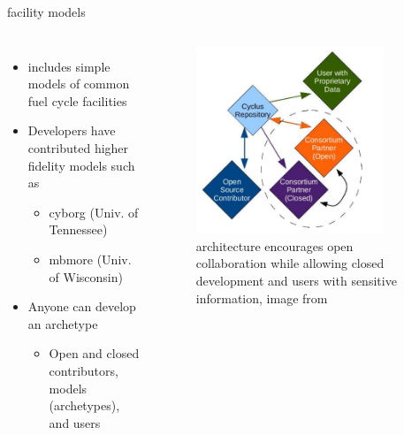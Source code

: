 \begin{frame}{\Cyclus facility models}
\begin{columns}
\begin{itemize}
    \item \Cycamore includes simple models of common fuel cycle facilities
    \item Developers have contributed higher fidelity models such as 
    \begin{itemize}
        \item cyborg (Univ. of Tennessee)
        \item mbmore (Univ. of Wisconsin)
    \end{itemize}
    \item Anyone can develop an archetype
    \begin{itemize}
        \item Open and closed contributors, models (archetypes), and users
    \end{itemize}
\end{itemize}
\begin{figure}
    \centering
    \includegraphics[width=0.85\textwidth]{images/Cyclus_ecosystem.png}
    \caption{\Cyclus architecture encourages open collaboration while allowing closed development and users with sensitive information, image from \cite{huff_fundamental_2016}}
    \label{fig:cyclus_ecosystem}
\end{figure}
\end{columns}
\end{frame}



